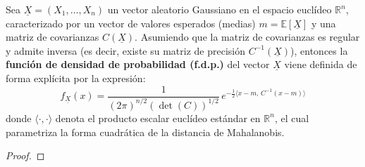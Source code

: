 \begin{definicion}
Sea $\underline{X} = (X_1, \dots, X_n)$ un vector aleatorio Gaussiano en el espacio euclídeo $\mathbb{R}^n$, caracterizado por un vector de valores esperados (medias) $m = \mathbb{E}[\underline{X}]$ y una matriz de covarianzas $C(\underline{X})$. Asumiendo que la matriz de covarianzas es regular y admite inversa (es decir, existe su matriz de precisión $C^{-1}(\underline{X})$), entonces la \textbf{función de densidad de probabilidad (f.d.p.)} del vector $\underline{X}$ viene definida de forma explícita por la expresión:
\begin{equation*}
    f_{\underline{X}}(x) = \frac{1}{(2\pi)^{n/2} \left(\det(C)\right)^{1/2}} \, e^{-\frac{1}{2} \langle x-m, \, C^{-1}(x-m) \rangle}
\end{equation*}
donde $\langle \cdot, \cdot \rangle$ denota el producto escalar euclídeo estándar en $\mathbb{R}^n$, el cual parametriza la forma cuadrática de la distancia de Mahalanobis.

\begin{proof}



\end{proof}
\end{definicion}
